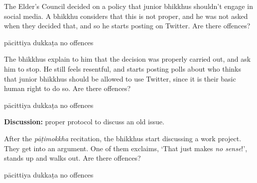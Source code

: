 \begin{exam}{\autoExamName}
  \problemDivide

  \begin{problem*}

    \begin{parts}

    \item The Elder's Council decided on a policy that junior bhikkhus shouldn't
      engage in social media. A bhikkhu considers that this is not proper, and
      he was not asked when they decided that, and so he starts posting on
      Twitter.
      Are there offences?

      \begin{answers}{3}
        \bChoices
         pācittiya\eAns
         dukkaṭa\eAns
         no offences\eAns
        \eChoices
      \end{answers}

    \item The bhikkhus explain to him that the decision was properly carried
      out, and ask him to stop. He still feels resentful, and starts posting
      polls about who thinks that junior bhikkhus should be allowed to use
      Twitter, since it is their basic human right to do so. Are there offences?

      \begin{answers}{3}
        \bChoices
         pācittiya\eAns
         dukkaṭa\eAns
         no offences\eAns
        \eChoices
      \end{answers}

      \bigskip
      
      \textbf{Discussion:} proper protocol to discuss an old issue.

    \end{parts}

  \end{problem*}

  \problemDivide

  \begin{problem*}

    \begin{parts}

    \item After the \textit{pāṭimokkha} recitation, the bhikkhus start
      discussing a work project. They get into an argument. One of them
      exclaims, `That just makes \textit{no sense}!', stands up and walks out.
      Are there offences?

      \bigskip

      \begin{answers}{3}
        \bChoices
         pācittiya\eAns
         dukkaṭa\eAns
         no offences\eAns
        \eChoices
      \end{answers}


\end{parts}
\end{problem*}
\end{exam}
